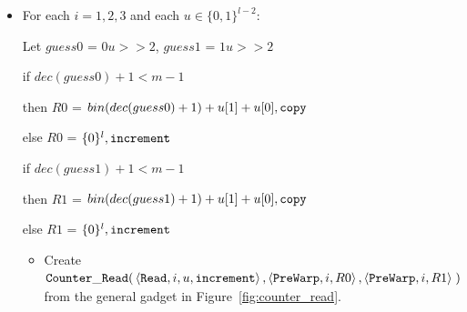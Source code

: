 \begin{itemize}

    \item For each $i = 1,2,3$ and each $u \in \{0, 1\}^{l-2}$:

    Let $guess0$ = $0u >> 2$, $guess1$ = $1u >> 2$

    \vspace{.5cm}
    if $dec(guess0) + 1 < m - 1$

    then $R0$ = $bin(dec(guess0) + 1)+u[1]+u[0], {\tt copy}$

    else $R0$ = $\{0 \}^l, {\tt increment}$

    \vspace{.5cm}

    if $dec(guess1) + 1 < m - 1$

    then $R1$ = $bin(dec(guess1) + 1)+u[1]+u[0], {\tt copy}$

    else $R1$ = $\{0 \}^l, {\tt increment}$

    \vspace{.5cm}

    \begin{itemize}
        \item Create
        $\begin{aligned}[t]
            {\tt Counter\_Read}(& \left\langle {\tt Read},    i,  u, {\tt increment} \right\rangle,
                     \left\langle {\tt PreWarp}, i, R0                  \right\rangle,
                     \left\langle {\tt PreWarp}, i, R1                  \right\rangle \;)
        \end{aligned}$\\from the general gadget in Figure~\ref{fig:counter_read}.
    \end{itemize}

\end{itemize}

